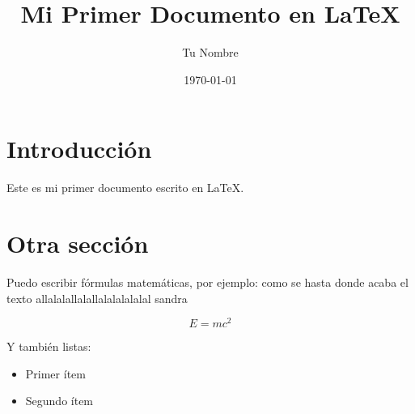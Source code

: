 \documentclass{article} %
\title{Mi Primer Documento en LaTeX}
\author{Tu Nombre}
\date{\today} %
\begin{document}
\maketitle

\section{Introducción}

Este es mi primer documento escrito en \LaTeX. 

\section{Otra sección}

Puedo escribir fórmulas matemáticas, por ejemplo: como se hasta donde acaba el texto allalalallalallalalalalalal sandra

\[
E = mc^2
\]

Y también listas:
\begin{itemize}
  \item Primer ítem
  \item Segundo ítem
\end{itemize}
\end{document}

